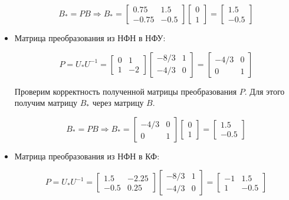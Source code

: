 \documentclass[14pt,a4paper,report]{report}
\begin{document}
\begin{itemize}
	\begin{equation*}
	\text{$B_{*}=PB$}
	\Longrightarrow
	\text{$B_{*}=\begin{bmatrix} 0.75 & 1.5 \\ -0.75 & -0.5 \end{bmatrix}\begin{bmatrix} 0 \\ 1 \end{bmatrix}=\begin{bmatrix} 1.5 \\ -0.5 \end{bmatrix}$}
	\end{equation*}
	
	
	
	
	\item Матрица преобразования из НФН в НФУ:
	
	\begin{equation*}
	\text{$P=U_{*}U^{-1}=\begin{bmatrix} 0 & 1 \\ 1 & -2 \end{bmatrix}\begin{bmatrix} -8/3 & 1\\ -4/3 & 0 \end{bmatrix}=\begin{bmatrix} -4/3 & 0 \\ 0 & 1 \end{bmatrix}$}
	\end{equation*}
	
	Проверим корректность полученной матрицы преобразования $P$. Для этого получим матрицу $B_{*}$ через матрицу $B$.
	
	\begin{equation*}
	\text{$B_{*}=PB$}
	\Longrightarrow
	\text{$B_{*}=\begin{bmatrix} -4/3 & 0 \\ 0 & 1 \end{bmatrix}\begin{bmatrix} 0 \\ 1 \end{bmatrix}=\begin{bmatrix} 1.5 \\ -0.5 \end{bmatrix}$}
	\end{equation*}
	
	\item Матрица преобразования из НФН в КФ:
	
	\begin{equation*}
	\text{$P=U_{*}U^{-1}=\begin{bmatrix} 1.5 & -2.25 \\ -0.5 & 0.25 \end{bmatrix}\begin{bmatrix} -8/3 & 1\\ -4/3 & 0 \end{bmatrix}=\begin{bmatrix} -1 & 1.5 \\ 1 & -0.5 \end{bmatrix}$}
	\end{equation*}
	

\end{itemize}
\end{document}
